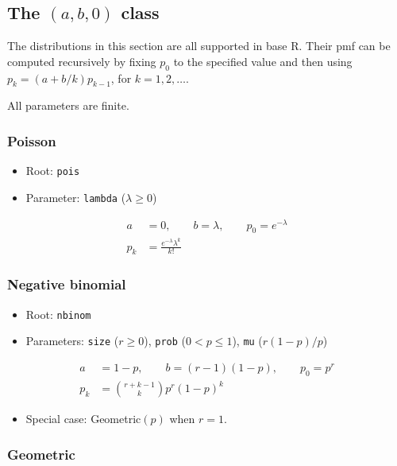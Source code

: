 \documentclass[x11names]{article}
\newcommand{\proglang}[1]{\textsf{#1}}
\newcommand{\code}[1]{\texttt{#1}}
\begin{document}
\subsection[The (a, b, 0) class]{The $(a, b, 0)$ class}
\label{sec:app:discrete:a-b-0}

The distributions in this section are all supported in base
\proglang{R}. Their pmf can be computed recursively by fixing $p_0$ to
the specified value and then using $p_k = (a + b/k) p_{k - 1}$, for
$k = 1, 2, \dots$.

All parameters are finite.

\subsubsection{Poisson}

\begin{itemize}
\item Root: \code{pois}
\item Parameter: \code{lambda} ($\lambda \geq 0$)
\end{itemize}
\begin{align*}
  a &= 0, \qquad b = \lambda, \qquad p_0 = e^{-\lambda} \\
  p_k &= \frac{e^{-\lambda} \lambda^k}{k!}
\end{align*}

\subsubsection{Negative binomial}

\begin{itemize}
\item Root: \code{nbinom}
\item Parameters: \code{size} ($r \geq 0$),
  \code{prob} ($0 < p \leq 1$),
  \code{mu} ($r(1 - p)/p$)
\end{itemize}
\begin{align*}
  a &= 1 - p, \qquad b = (r - 1)(1 - p), \qquad p_0 = p^r \\
  p_k &= \binom{r+k-1}{k} p^r (1 - p)^k
\end{align*}

\begin{itemize}
\item Special case: Geometric$(p)$ when $r = 1$.
\end{itemize}

\subsubsection{Geometric}
\end{document}
